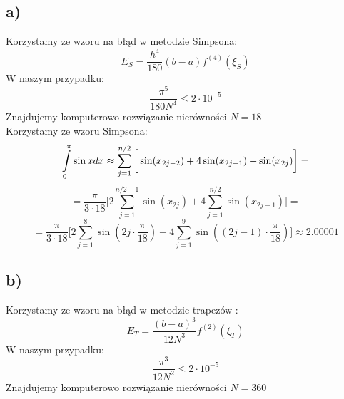 \documentclass{article}
\title{}
\date{6.01.2021}
\begin{document}
\subsection*{a)}
Korzystamy ze wzoru na błąd w metodzie Simpsona:
\begin{equation}
E_S = \frac{h^4}{180}(b-a)f^{(4)}(\xi_S)
\end{equation}
W naszym przypadku:
$$
\frac{\pi^5}{180N^4} \leq 2\cdot 10^{-5}
$$
Znajdujemy komputerowo rozwiązanie nierówności $N = 18$\\
Korzystamy ze wzoru Simpsona:
$$
\int\limits_{0}^{\pi}\sin{x}dx \approx 
\sum_{j=1}^{n/2}\bigg[\sin(x_{2j-2})+4\sin(x_{2j-1})+\sin(x_{2j})\bigg]\\
{} =
$$
$$= \frac{\pi}{3\cdot18} 
\bigg[2\sum_{j=1}^{n/2-1}\sin(x_{2j}) + 4\sum_{j=1}^{n/2}\sin(x_{2j-1})\bigg] =
$$
$$
= \frac{\pi}{3\cdot18} 
\bigg[2\sum_{j=1}^{8}\sin(2j \cdot \frac{\pi}{18}) + 4\sum_{j=1}^{9}\sin((2j-1) \cdot \frac{\pi}{18})\bigg] \approx 2.00001
$$
\subsection*{b)}
Korzystamy ze wzoru na błąd w metodzie trapezów :
\begin{equation}
E_T = \frac{(b-a)^3}{12N^3}f^{(2)}(\xi_T)
\end{equation}
W naszym przypadku:
$$
\frac{\pi^3}{12N^2} \leq 2\cdot 10^{-5}
$$
Znajdujemy komputerowo rozwiązanie nierówności $N = 360$ 
\end{document}
